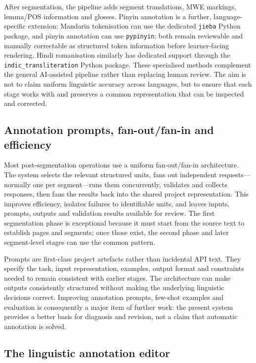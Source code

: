 After segmentation, the pipeline adds segment translations, MWE markings,
lemma/POS information and glosses. Pinyin annotation is a further,
language-specific extension: Mandarin tokenisation can use the dedicated
\texttt{jieba} Python package, and pinyin annotation can use \texttt{pypinyin};
both remain reviewable and manually correctable as structured token
information before learner-facing rendering. Hindi romanisation similarly has
dedicated support through the \texttt{indic\_transliteration} Python package.
These specialised methods complement the general AI-assisted pipeline rather
than replacing human review. The aim is not to claim uniform linguistic
accuracy across languages, but to ensure that each stage works with and
preserves a common representation that can be inspected and corrected.

\subsection{Annotation prompts, fan-out/fan-in and efficiency}

Most post-segmentation operations use a uniform fan-out/fan-in architecture.
The system selects the relevant structured units, fans out independent
requests---normally one per segment---runs them concurrently, validates and
collects responses, then fans the results back into the shared project
representation. This improves efficiency, isolates failures to identifiable
units, and leaves inputs, prompts, outputs and validation results available
for review. The first segmentation phase is exceptional because it must start
from the source text to establish pages and segments; once those exist, the
second phase and later segment-level stages can use the common pattern.

Prompts are first-class project artefacts rather than incidental API text.
They specify the task, input representation, examples, output format and
constraints needed to remain consistent with earlier stages. The architecture
can make outputs consistently structured without making the underlying
linguistic decisions correct. Improving annotation prompts, few-shot examples
and evaluation is consequently a major item of further work: the present
system provides a better basis for diagnosis and revision, not a claim that
automatic annotation is solved.

\subsection{The linguistic annotation editor}

